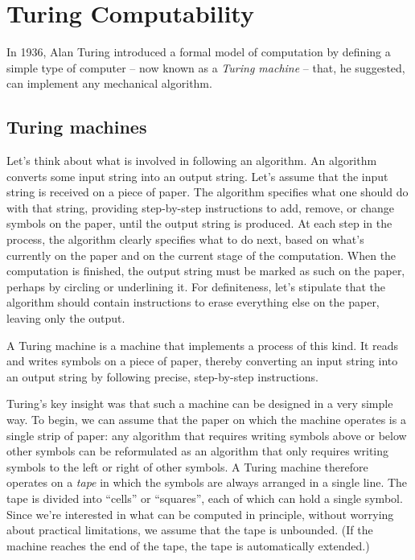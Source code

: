 \setcounter{chapter}{5}
\chapter{Turing Computability}\label{ch:turing}


In 1936,
Alan Turing introduced a formal model of computation
by defining a simple type of computer -- now known as a \emph{Turing machine} -- that,
he suggested,
can implement any mechanical algorithm.

\section{Turing machines}\label{sec:tm}

Let's think about what is involved in following an algorithm.
An algorithm converts some input string into an output string.
Let's assume that
the input string is received on a piece of paper.
The algorithm specifies what one should do with that string,
providing step-by-step instructions to
add, remove, or change symbols on the paper,
until the output string is produced.
At each step in the process,
the algorithm clearly specifies what to do next,
based on what's currently on the paper
and on the current stage of the computation.
When the computation is finished,
the output string must be marked as such on the paper,
perhaps by circling or underlining it.
For definiteness,
let's stipulate that
the algorithm should contain instructions to erase everything else on the paper,
leaving only the output.

A Turing machine is a machine that implements a process of this kind.
It reads and writes symbols on a piece of paper,
thereby converting an input string into an output string
by following precise, step-by-step instructions.

Turing's key insight was that
such a machine can be designed in a very simple way.
To begin,
we can assume that
the paper on which the machine operates is a single strip of paper:
any algorithm that requires writing symbols above or below other symbols
can be reformulated as an algorithm that only requires writing symbols
to the left or right of other symbols.
A Turing machine therefore operates on a \emph{tape}
in which the symbols are always arranged in a single line.
The tape is divided into ``cells'' or ``squares'',
each of which can hold a single symbol.
Since we're interested in what can be computed in principle,
without worrying about practical limitations,
we assume that the tape is unbounded.
(If the machine reaches the end of the tape,
the tape is automatically extended.)

